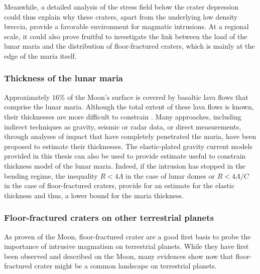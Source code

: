Meanwhile, a  detailed analysis of  the stress field below  the crater
depression  could  thus explain  why  these  craters, apart  from  the
underlying low  density breccia,  provide a favorable  environment for
magmatic  intrusions.   At  a  regional scale,  it  could  also  prove
fruitful to investigate  the link between the load of  the lunar maria
and the  distribution of floor-fractured  craters, which is  mainly at
the edge of the maria itself.

\subsubsection*{Thickness of the lunar maria}
\label{sec:crust-magm-intr}

Approximately $16\%$ of the Moon's surface is covered by basaltic lava
flows  that comprise  the lunar  maria. Although  the total  extent of
these lava  flows is  known, their thicknesses  are more  difficult to
constrain \citep{Thomson:2009eo}. Many  approaches, including indirect
techniques as gravity, seismic or  radar data, or direct measurements,
through analyses of impact that  have completely penetrated the maria,
have been proposed to  estimate their thicknesses.  The elastic-plated
gravity current  models provided in  this thesis  can also be  used to
provide  estimate useful  to constrain  thickness model  of the  lunar
maria.  Indeed,  if the intrusion  has stopped in the  bending regime,
the  inequality  $R<   4\Lambda$  in  the  case  of   lunar  domes  or
$R<4\Lambda/C$ in the case of  floor-fractured craters, provide for an
estimate for  the elastic thickness  and thus,  a lower bound  for the
maria thickness.

\subsubsection*{Floor-fractured craters on other terrestrial planets}

As proven of  the Moon, floor-fractured crater are a  good first basis
to probe the importance of intrusive magmatism on terrestrial planets.
While they  have first been observed  and described on the  Moon, many
evidences  show now  that  floor-fractured crater  might  be a  common
landscape on terrestrial planets.

